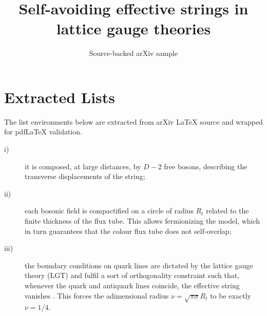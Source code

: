 \documentclass[11pt]{article}
\title{Self-avoiding effective strings in lattice gauge theories}
\author{Source-backed arXiv sample}
\date{}
\begin{document}
\maketitle
\section{Extracted Lists}

The list environments below are extracted from arXiv LaTeX source and wrapped for pdfLaTeX validation.

\begin{description}
  \item[i)] it is  composed, at large distances, by $D-2$
free bosons, describing the transverse displacements of the string;
  \item[ii)] each bosonic field is compactified on a circle of radius
$R_t$ related to the finite thickness of the flux tube. This allows
fermionizing  the model, which  in turn guarantees that the colour
flux tube does not self-overlap;
  \item[iii)] the boundary conditions on  quark lines are dictated
by the lattice gauge theory (LGT) and fulfil a sort of orthogonality
constraint such that, whenever the quark and antiquark lines coincide,
 the effective string vanishes . This   forces the adimensional radius
$\nu=\sqrt{\pi\sigma}R_t$  to be exactly $\nu=1/4$.
\end{description}
\end{document}
